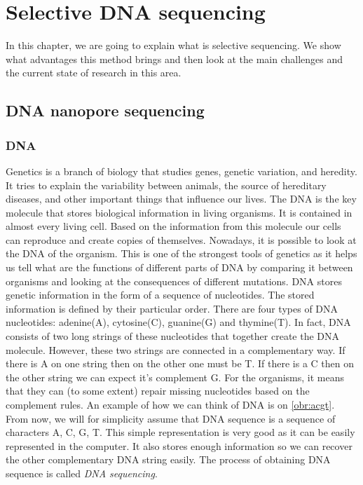 \chapter{Selective DNA sequencing}
\label{kap:selSeq}

In this chapter, we are going to explain what is selective sequencing. We
show what advantages this method brings and then look at the main challenges and
the current state of research in this area.

\section{DNA nanopore sequencing}

\subsection{DNA}

Genetics is a branch of biology that studies genes, genetic variation, and heredity.
It tries to explain the variability between animals, the source of hereditary diseases, and
other important things that influence our lives. The DNA is the key molecule
that stores biological information in living organisms. It is contained in
almost every living cell. Based on the information from this molecule our cells can reproduce and create copies of
themselves. Nowadays, it is possible to look at the DNA of the organism. This is
one of the strongest tools of genetics as it helps us tell what are the functions
of different parts of DNA by comparing it between organisms and looking at the
consequences of different mutations. DNA stores genetic information in the form of a sequence of
nucleotides. The stored information is defined by their particular order. There are four types of DNA nucleotides:
adenine(A), cytosine(C), guanine(G) and thymine(T). In fact, DNA consists of two long
strings of these nucleotides that together create the DNA molecule. However, these
two strings are connected in a complementary way. If there is A on one string
then on the other one must be T. If there is a C then on the other string we can expect
it's complement G. For the organisms, it means that they can (to some extent) repair
missing nucleotides based on the complement rules. An example of how we can think
of DNA is on \ref{obr:acgt}. From now, we will for simplicity assume that DNA
sequence is a sequence of characters A, C, G, T. This simple representation
is very good as it can be easily represented in the computer. It also stores enough
information so we can recover the other complementary DNA string easily.
The process of obtaining DNA sequence is called \textit{DNA sequencing}.

